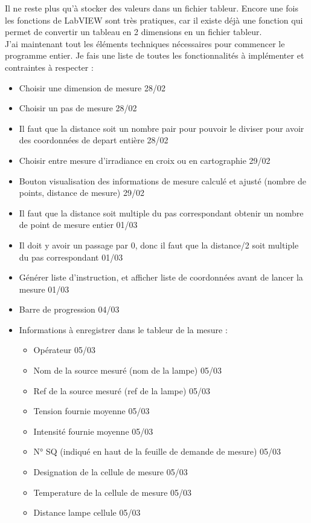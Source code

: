 \documentclass[12pt]{article}
\begin{document}
Il ne reste plus qu'à stocker des valeurs dans un fichier tableur.
Encore une fois les fonctions de LabVIEW sont très pratiques, car il existe déjà une fonction qui permet de convertir un tableau en 2 dimensions en un fichier tableur.\\
J'ai maintenant tout les éléments techniques nécessaires pour commencer le programme entier.
Je fais une liste de toutes les fonctionnalités à implémenter et contraintes à respecter :
\begin{itemize}
	\item  Choisir une dimension de mesure  28/02
	\item  Choisir un pas de mesure  28/02
	\item  Il faut que la distance soit un nombre pair pour pouvoir le diviser pour avoir des coordonnées de depart entière  28/02
	\item  Choisir entre mesure d'irradiance en croix ou en cartographie 29/02
	\item  Bouton visualisation des informations de mesure calculé et ajusté (nombre de points, distance de mesure)  29/02
	\item  Il faut que la distance soit multiple du pas correspondant obtenir un nombre de point de mesure entier  01/03
	\item  Il doit y avoir un passage par 0, donc il faut que la distance/2 soit multiple du pas correspondant  01/03
	\item  Générer liste d'instruction, et afficher liste de coordonnées avant de lancer la mesure  01/03
	\item  Barre de progression  04/03
	\item  Informations à enregistrer dans le tableur de la mesure :
		\begin{itemize}
	\item  Opérateur  05/03
	\item  Nom de la source mesuré (nom de la lampe)  05/03
	\item  Ref de la source mesuré (ref de la lampe)  05/03
	\item  Tension fournie moyenne  05/03
	\item  Intensité fournie moyenne  05/03
	\item  N° SQ (indiqué en haut de la feuille de demande de mesure)  05/03
	\item  Designation de la cellule de mesure  05/03
	\item  Temperature de la cellule de mesure  05/03
	\item  Distance lampe cellule  05/03

\end{itemize}
\end{itemize}
\end{document}
